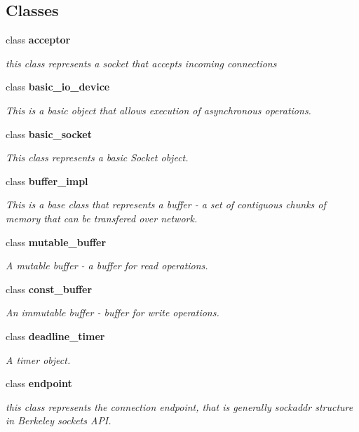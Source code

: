 \subsection*{\-Classes}
\begin{DoxyCompactItemize}
\item 
class {\bf acceptor}
\begin{DoxyCompactList}\small\item\em this class represents a socket that accepts incoming connections \end{DoxyCompactList}\item 
class {\bf basic\-\_\-io\-\_\-device}
\begin{DoxyCompactList}\small\item\em \-This is a basic object that allows execution of asynchronous operations. \end{DoxyCompactList}\item 
class {\bf basic\-\_\-socket}
\begin{DoxyCompactList}\small\item\em \-This class represents a basic \-Socket object. \end{DoxyCompactList}\item 
class {\bf buffer\-\_\-impl}
\begin{DoxyCompactList}\small\item\em \-This is a base class that represents a buffer -\/ a set of contiguous chunks of memory that can be transfered over network. \end{DoxyCompactList}\item 
class {\bf mutable\-\_\-buffer}
\begin{DoxyCompactList}\small\item\em \-A mutable buffer -\/ a buffer for read operations. \end{DoxyCompactList}\item 
class {\bf const\-\_\-buffer}
\begin{DoxyCompactList}\small\item\em \-An immutable buffer -\/ buffer for write operations. \end{DoxyCompactList}\item 
class {\bf deadline\-\_\-timer}
\begin{DoxyCompactList}\small\item\em \-A timer object. \end{DoxyCompactList}\item 
class {\bf endpoint}
\begin{DoxyCompactList}\small\item\em this class represents the connection endpoint, that is generally sockaddr structure in \-Berkeley sockets \-A\-P\-I. \end{DoxyCompactList}\item 

\end{DoxyCompactItemize}
